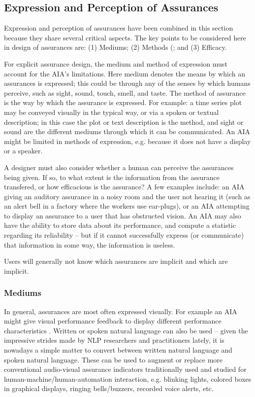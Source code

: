 \subsection{Expression and Perception of Assurances} \label{sec:express_assurances}
Expression and perception of assurances have been combined in this section because they share several critical aspects. The key points to be considered here in design of assurances are:
(1) Mediums; (2) Methods (; and (3) Efficacy.     
    
For explicit assurance design, the medium and method of expression must account for the AIA's limitations. 
Here medium denotes the means by which an assurances is expressed; this could be through any of the senses by which humans perceive, such as sight, sound, touch, smell, and taste. The method of assurance is the way by which the assurance is expressed. For example: a time series plot may be conveyed visually in the typical way, or via a spoken or textual description; in this case the plot or text description is the method, and sight or sound are the different mediums through which it can be communicated. An AIA might be limited in methods of expression, e.g. because it does not have a display or a speaker.

A designer must also consider whether a human can perceive the assurances being given. If so, to what extent is the information from the assurance transfered, or how efficacious is the assurance? A few examples include: an AIA giving an auditory assurance in a noisy room and the user not hearing it (such as an alert bell in a factory where the workers use ear-plugs), or an AIA attempting to display an assurance to a user that has obstructed vision.
An AIA may also have the ability to store data about its performance, and compute a statistic regarding its reliability -- but if it cannot successfully express (or communicate) that information in some way, the information is useless.

Users will generally not know which assurances are implicit and which are implicit.

\subsubsection{Mediums}
In general, assurances are most often expressed visually. For example an AIA might give visual performance feedback to display different performance characteristics \cite{Chadalavada2015-wx,Muir1996-gt}. Written or spoken natural language can also be used \cite{Wang2016-id} -- given the impressive strides made by NLP researchers and practitioners lately, it is nowadays a simple matter to convert between written natural language and spoken natural language. 
These can be used to augment or replace more conventional audio-visual assurance indicators traditionally used and studied for human-machine/human-automation interaction, e.g. blinking lights, colored boxes in graphical displays, ringing bells/buzzers, recorded voice alerts, etc.
    
